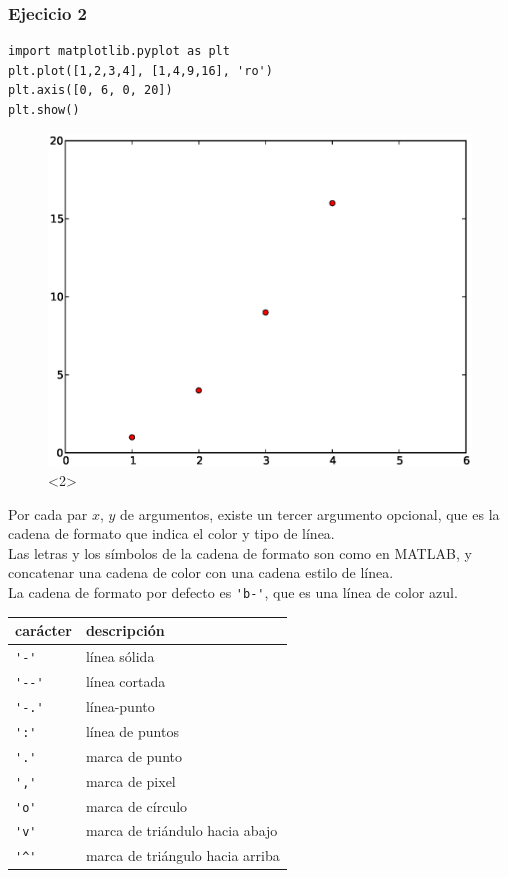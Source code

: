 \begin{frame}[fragile]
\frametitle{Ejecicio 2}
\begin{lstlisting}
import matplotlib.pyplot as plt
plt.plot([1,2,3,4], [1,4,9,16], 'ro')
plt.axis([0, 6, 0, 20])
plt.show()
\end{lstlisting}
\begin{figure}
	\centering
	\includegraphics[scale=0.35]{plotEjercicio2.eps}<2> 
\end{figure}
\end{frame}
\begin{frame}[fragile]
Por cada par $x$, $y$ de argumentos, existe un tercer argumento opcional, que es la cadena de formato que indica el color y tipo de l\'{i}nea.
\\
\medskip
Las letras y los s\'{i}mbolos de la cadena de formato son como en MATLAB, y concatenar una cadena de color con una cadena estilo de l\'{i}nea.
\\
\medskip
La cadena de formato por defecto es \verb|'b-'|, que es una l\'{i}nea de color azul.
\end{frame}
\begin{frame}[fragile]
\begin{tabular}{l | l}
car\'{a}cter & descripci\'{o}n \\ \hline
\verb|'-'|	& l\'{i}nea s\'{o}lida \\ \hline
\verb|'--'| & l\'{i}nea cortada \\ \hline
\verb|'-.'| & l\'{i}nea-punto \\ \hline
\verb|':'|	& l\'{i}nea de puntos \\ \hline
\verb|'.'|	& marca de punto \\ \hline
\verb|','|	& marca de pixel \\ \hline
\verb|'o'|	& marca de c\'{i}rculo \\ \hline
\verb|'v'|	& marca de tri\'{a}ndulo hacia abajo \\ \hline
\verb|'^'|	& marca de tri\'{a}ngulo hacia arriba
\end{tabular}
\end{frame}
